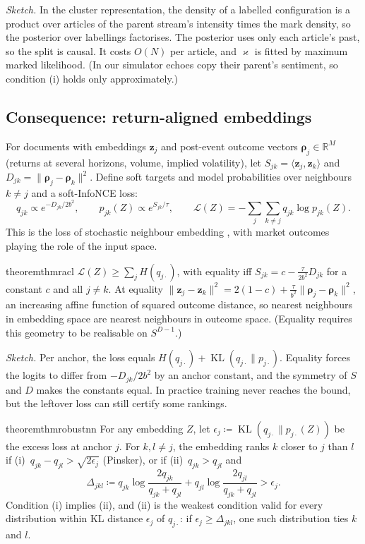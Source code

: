\documentclass{article}
\theoremstyle{plain}
\theoremstyle{definition}
\theoremstyle{remark}
\newcommand{\R}{\mathbb{R}}
\newcommand{\z}{\bm{z}}
\DeclareMathOperator{\KL}{KL}
\begin{document}
\emph{Sketch.} In the cluster representation, the density of a labelled configuration is a product over articles of the parent stream's intensity times the mark density, so the posterior over labellings factorises. The posterior uses only each article's past, so the split is causal. It costs $O(N)$ per article, and $\varkappa$ is fitted by maximum marked likelihood. (In our simulator echoes copy their parent's sentiment, so condition (i) holds only approximately.)

\subsection{Consequence: return-aligned embeddings}\label{sec:embeddings}

For documents with embeddings $\z_j$ and post-event outcome vectors $\bm\rho_j\in\R^M$ (returns at several horizons, volume, implied volatility), let $S_{jk}=\langle\z_j,\z_k\rangle$ and $D_{jk}=\|\bm\rho_j-\bm\rho_k\|^2$. Define soft targets and model probabilities over neighbours $k\neq j$ and a soft-InfoNCE loss:
\[
  q_{jk}\propto e^{-D_{jk}/2b^2},\qquad p_{jk}(Z)\propto e^{S_{jk}/\tau},\qquad \mathcal{L}(Z)=-\sum_j\sum_{k\neq j}q_{jk}\log p_{jk}(Z).
\]
This is the loss of stochastic neighbour embedding \citep{hinton2002}, with market outcomes playing the role of the input space.

\begin{restatable}{theorem}{thmracl}\label{thm:racl}
$\mathcal{L}(Z)\ge\sum_jH(q_{j\cdot})$, with equality iff $S_{jk}=c-\frac{\tau}{2b^2}D_{jk}$ for a constant $c$ and all $j\neq k$. At equality $\|\z_j-\z_k\|^2=2(1-c)+\frac{\tau}{b^2}\|\bm\rho_j-\bm\rho_k\|^2$, an increasing affine function of squared outcome distance, so nearest neighbours in embedding space are nearest neighbours in outcome space. (Equality requires this geometry to be realisable on $S^{D-1}$.)
\end{restatable}

\emph{Sketch.} Per anchor, the loss equals $H(q_{j\cdot})+\KL(q_{j\cdot}\|p_{j\cdot})$. Equality forces the logits to differ from $-D_{jk}/2b^2$ by an anchor constant, and the symmetry of $S$ and $D$ makes the constants equal. In practice training never reaches the bound, but the leftover loss can still certify some rankings.

\begin{restatable}{theorem}{thmrobustnn}\label{thm:robustnn}
For any embedding $Z$, let $\epsilon_j\coloneqq\KL(q_{j\cdot}\|p_{j\cdot}(Z))$ be the excess loss at anchor $j$. For $k,l\neq j$, the embedding ranks $k$ closer to $j$ than $l$ if (i)~$q_{jk}-q_{jl}>\sqrt{2\epsilon_j}$ (Pinsker), or if (ii)~$q_{jk}>q_{jl}$ and
\[
  \Delta_{jkl}\coloneqq q_{jk}\log\frac{2q_{jk}}{q_{jk}+q_{jl}}+q_{jl}\log\frac{2q_{jl}}{q_{jk}+q_{jl}}>\epsilon_j .
\]
Condition (i) implies (ii), and (ii) is the weakest condition valid for every distribution within KL distance $\epsilon_j$ of $q_{j\cdot}$: if $\epsilon_j\ge\Delta_{jkl}$, one such distribution ties $k$ and $l$.
\end{restatable}
\end{document}
